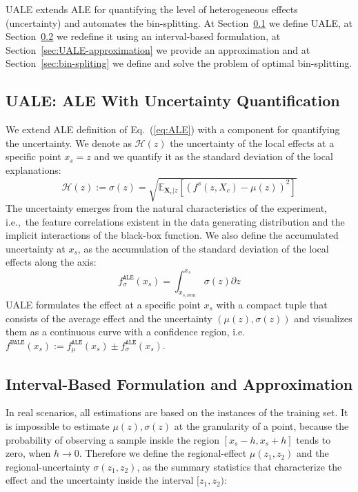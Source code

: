 \documentclass[twoside]{article}
\newcommand{\dfdx}{f^s}
\newcommand{\Xcb}{\mathbf{X}_c}
\begin{document}
UALE extends ALE for quantifying the level of heterogeneous effects
(uncertainty) and automates the bin-splitting. At
Section~\ref{sec:UALE-definition-1} we define UALE, at
Section~\ref{sec:UALE-definition-2} we redefine it using an
interval-based formulation, at
Section~\ref{sec:UALE-approximation} we provide an
approximation and at Section~\ref{sec:bin-spliting} we define and
solve the problem of optimal bin-splitting.

\subsection{UALE: ALE With Uncertainty Quantification}
\label{sec:UALE-definition-1}

We extend ALE definition of Eq.~(\ref{eq:ALE}) with a component for
quantifying the uncertainty. We denote as \(\mathcal{H}(z)\) the
uncertainty of the local effects at a specific point \(x_s=z\) and we
quantify it as the standard deviation of the local explanations:
\begin{equation}
  \label{eq:ALE_var}
  \mathcal{H}(z) := \sigma(z) = \sqrt{\mathbb{E}_{\Xcb|z}\left [ \left (\dfdx (z, X_c) - \mu(z) \right )^2 \right ] }
\end{equation}
\noindent
The uncertainty emerges from the natural characteristics of the
experiment, i.e.,~the feature correlations existent in the data
generating distribution and the implicit interactions of the black-box
function. We also define the accumulated uncertainty at \(x_s\), as
the accumulation of the standard deviation of the local effects along
the axis:
\begin{equation}
  \label{eq:ALE_acc_unc}
  f^{\mathtt{ALE}}_{\sigma}(x_s) = \int_{x_{s, min}}^{x_s} \sigma(z) \partial z
\end{equation}
\noindent
UALE formulates the effect at a specific point \(x_s\) with a compact
tuple that consists of the average effect and the uncertainty
\((\mu(z), \sigma(z))\) and visualizes them as a continuous curve with
a confidence region, i.e.
\(f^{\mathtt{UALE}}(x_s) := f^{\mathtt{ALE}}_{\mu}(x_s) \pm
f^{\mathtt{ALE}}_{\sigma}(x_s)\).

\subsection{Interval-Based Formulation and Approximation}
\label{sec:UALE-definition-2}

In real scenarios, all estimations are based on the instances of the
training set. It is impossible to estimate \(\mu(z), \sigma(z)\) at
the granularity of a point, because the probability of observing a
sample inside the region \([x_s - h, x_s + h]\) tends to zero, when
\(h \to 0\). Therefore we define the regional-effect \(\mu(z_1, z_2)\)
and the regional-uncertainty \(\sigma(z_1, z_2)\), as the summary
statistics that characterize the effect and the uncertainty inside the
interval \([z_1, z_2)\):
\end{document}
